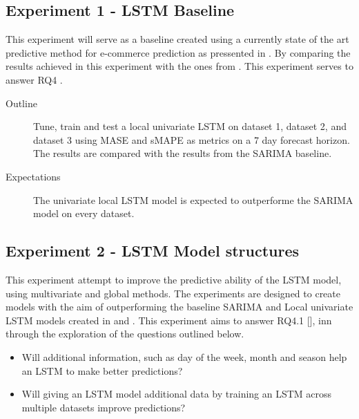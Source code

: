 \subsection{Experiment 1 - LSTM Baseline}
\label{section:results:experimentPlan:Experiment-1}
This experiment will serve as a baseline created using a currently state of the art predictive method
for e-commerce prediction as pressented in .
By comparing the results achieved in this experiment with the ones from .
This experiment serves to answer RQ4 .

\begin{description}
  \item[Outline]{
              Tune, train and test a local univariate LSTM on dataset 1,
              dataset 2, and dataset 3 using MASE and sMAPE as metrics on a 7 day forecast horizon.
              The results are compared with the results from the SARIMA baseline. }
\end{description}

\begin{description}
  \item[Expectations]{
              The univariate local LSTM model is expected to outperforme the SARIMA model on every dataset.
        }
\end{description}




\subsection{Experiment 2 - LSTM Model structures}
\label{section:results:experimentPlan:Experiment-2}
This experiment attempt to improve the predictive ability of the LSTM model,
using multivariate and global methods.
The experiments are designed to create models with the aim of outperforming the baseline
SARIMA and Local univariate LSTM models created in  and .
This experiment aims to answer RQ4.1 [],
inn through the exploration of the questions outlined below.

\begin{itemize}
  \item {Will additional information, such as day of the week, month and season help an LSTM to make better predictions?}
  \item {Will giving an LSTM model additional data by training an LSTM across multiple datasets improve predictions?}
\end{itemize}

